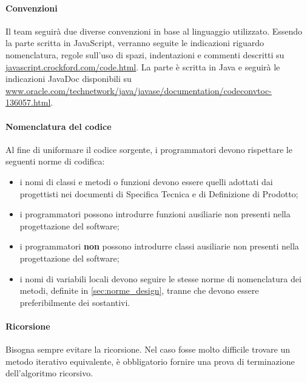 	\paragraph{Convenzioni} \label{sec:conv}
	Il team seguirà due diverse convenzioni in base al linguaggio utilizzato. Essendo la parte  scritta in JavaScript, verranno seguite le indicazioni riguardo nomenclatura, regole sull'uso di spazi, indentazioni e commenti descritti su \url{javascript.crockford.com/code.html}. La parte  è scritta in Java e seguirà le indicazioni JavaDoc disponibili su \url{www.oracle.com/technetwork/java/javase/documentation/codeconvtoc-136057.html}.
	
	\paragraph{Nomenclatura del codice}
	Al fine di uniformare il codice sorgente, i programmatori devono rispettare le seguenti norme di codifica:
	\begin{itemize}
		\item i nomi di classi e metodi o funzioni devono essere quelli adottati dai progettisti nei documenti di Specifica Tecnica e di Definizione di Prodotto;
		\item i programmatori possono introdurre funzioni ausiliarie non presenti nella progettazione del software;
		\item i programmatori \textbf{non} possono introdurre classi ausiliarie non presenti nella progettazione del software;
		\item i nomi di variabili locali devono seguire le stesse norme di nomenclatura dei metodi, definite in \ref{sec:norme_design}, tranne che devono essere preferibilmente dei sostantivi.
	\end{itemize}
	
	\paragraph{Ricorsione}
	Bisogna sempre evitare la ricorsione. Nel caso fosse molto difficile trovare un metodo iterativo equivalente, è obbligatorio fornire una prova di terminazione dell'algoritmo ricorsivo.


